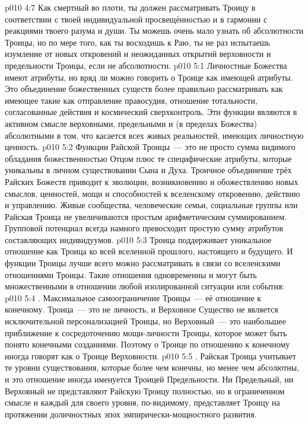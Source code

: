 \vs p010 4:7 Как смертный во плоти, ты должен рассматривать Троицу в соответствии с твоей индивидуальной просвещённостью и в гармонии с реакциями твоего разума и души. Ты можешь очень мало узнать об абсолютности Троицы, но по мере того, как ты восходишь к Раю, ты не раз испытаешь изумление от новых откровений и неожиданных открытий верховности и предельности Троицы, если не абсолютности.
\vs p010 5:1 Личностные Божества имеют атрибуты, но вряд ли можно говорить о Троице как имеющей атрибуты. Это объединение божественных существ более правильно рассматривать как имеющее  такие как отправление правосудия, отношение тотальности, согласованные действия и космический сверхконтроль. Эти функции являются в активном смысле верховными, предельными и (в пределах Божества) абсолютными в том, что касается всех живых реальностей, имеющих личностную ценность.
\vs p010 5:2 Функции Райской Троицы~--- это не просто сумма видимого обладания божественностью Отцом плюс те специфические атрибуты, которые уникальны в личном существовании Сына и Духа. Троичное объединение трёх Райских Божеств приводит к эволюции, возникновению и обожествлению новых смыслов, ценностей, мощи и способностей к вселенскому откровению, действию и управлению. Живые сообщества, человеческие семьи, социальные группы или Райская Троица не увеличиваются простым арифметическим суммированием. Групповой потенциал всегда намного превосходит простую сумму атрибутов составляющих индивидуумов.
\vs p010 5:3 \pc Троица поддерживает уникальное отношение как Троица ко всей вселенной прошлого, настоящего и будущего. И функции Троицы лучше всего можно рассматривать в связи со вселенскими отношениями Троицы. Такие отношения одновременны и могут быть множественными в отношении любой изолированной ситуации или события:
\vs p010 5:4 . Максимальное самоограничение Троицы~--- её отношение к конечному. Троица~--- это не личность, и Верховное Существо не является исключительной персонализацией Троицы, но Верховный~--- это наибольшее приближение к сосредоточению мощи\hyp{}личности Троицы, которое может быть понято конечными созданиями. Поэтому о Троице по отношению к конечному иногда говорят как о Троице Верховности.
\vs p010 5:5 . Райская Троица учитывает те уровни существования, которые более чем конечны, но менее чем абсолютны, и это отношение иногда именуется Троицей Предельности. Ни Предельный, ни Верховный не представляют Райскую Троицу полностью, но в ограниченном смысле и каждый для своего уровня, по\hyp{}видимому, представляет Троицу на протяжении доличностных эпох эмпирически\hyp{}мощностного развития.
